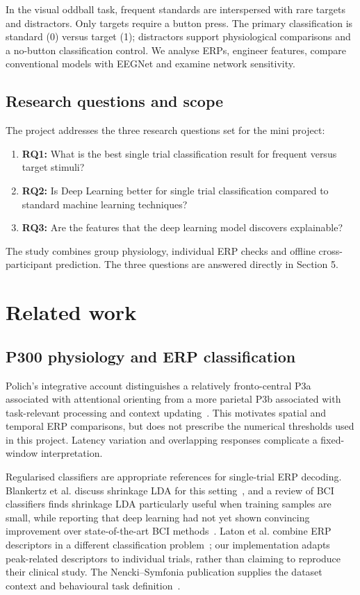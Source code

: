 \documentclass[11pt,a4paper]{article}
\begin{document}
In the visual oddball task, frequent standards are interspersed with rare targets and distractors. Only targets require a button press. The primary classification is standard (0) versus target (1); distractors support physiological comparisons and a no-button classification control. We analyse ERPs, engineer features, compare conventional models with EEGNet and examine network sensitivity.

\subsection{Research questions and scope}
The project addresses the three research questions set for the mini project:
\begin{enumerate}
\item \textbf{RQ1:} What is the best single trial classification result for frequent versus target stimuli?
\item \textbf{RQ2:} Is Deep Learning better for single trial classification compared to standard machine learning techniques?
\item \textbf{RQ3:} Are the features that the deep learning model discovers explainable?
\end{enumerate}
The study combines group physiology, individual ERP checks and offline cross-participant prediction. The three questions are answered directly in Section 5.

\section{Related work}
\subsection{P300 physiology and ERP classification}
Polich's integrative account distinguishes a relatively fronto-central P3a associated with attentional orienting from a more parietal P3b associated with task-relevant processing and context updating~\cite{polich}. This motivates spatial and temporal ERP comparisons, but does not prescribe the numerical thresholds used in this project. Latency variation and overlapping responses complicate a fixed-window interpretation.

Regularised classifiers are appropriate references for single-trial ERP decoding. Blankertz et al. discuss shrinkage LDA for this setting~\cite{blankertz}, and a review of BCI classifiers finds shrinkage LDA particularly useful when training samples are small, while reporting that deep learning had not yet shown convincing improvement over state-of-the-art BCI methods~\cite{lotte}. Laton et al. combine ERP descriptors in a different classification problem~\cite{laton}; our implementation adapts peak-related descriptors to individual trials, rather than claiming to reproduce their clinical study. The Nencki--Symfonia publication supplies the dataset context and behavioural task definition~\cite{dataset}.
\end{document}
